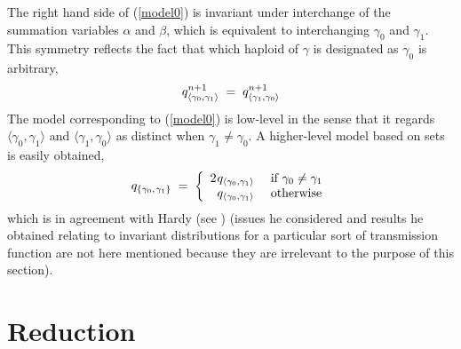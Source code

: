 The right hand side of (\ref{model0}) is invariant under interchange
of the summation variables $\alpha$ and $\beta$, which is equivalent
to interchanging $\gamma_0$ and $\gamma_1$.  This symmetry reflects
the fact that which haploid of $\gamma$ is designated as $\gamma_0$ is
arbitrary,\\[-.05in]
\[
q_{\langle \gamma_0, \gamma_1 \rangle}^{n+1} \; = \;
q_{\langle \gamma_1, \gamma_0 \rangle}^{n+1}\\[.1in]
\]
The model corresponding to (\ref{model0}) is low-level in the sense
that it regards $\langle \gamma_0, \gamma_1 \rangle$ and $\langle
\gamma_1, \gamma_0 \rangle$ as distinct when $\gamma_1 \neq \gamma_0$.
A higher-level model based on sets is easily obtained,
\[
q_{\{\gamma_0, \nudge \gamma_1\}} \; = \; \left\{
\begin{array}{ll}
2 \nudge q_{\langle \gamma_0, \gamma_1 \rangle} & \mbox{ if $\gamma_0 \neq \gamma_1$}\\
\phantom{2 \nudge }q_{\langle \gamma_0, \gamma_1 \rangle} & \mbox{ otherwise}
\end{array}
\right.\\[.05in]
\]
which is in agreement with Hardy (see \cite{Hardy1908}) (issues he considered
and results he obtained relating to invariant distributions for a
particular sort of transmission function are not here mentioned
because they are irrelevant to the purpose of this section).

\section{Reduction}

